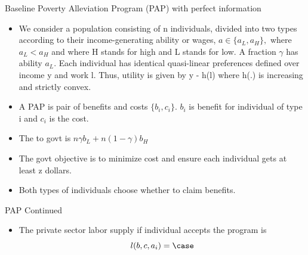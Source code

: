 \documentclass{beamer}
\begin{document}
\begin{frame}{Baseline Poverty Alleviation Program (PAP) with perfect information}
\begin{itemize}
    \item We consider a population consisting of n
 individuals, divided into two types according
 to their income-generating ability or wages, $ a \in
 \{a_L, a_H\},$ where $a_L <a_H $ and where H stands
 for high and L stands for low. A fraction $\gamma$
 has ability $a_L$. Each individual has identical quasi-linear preferences defined over income y and work l. Thus, utility is given by y - h(l) where
 h(.) is increasing and strictly convex.
 \item A PAP is pair of benefits and costs $\{b_i , c_i\}$. $b_i$ is benefit for individual of type i and $c_i$ is the cost. 
 \item The to govt is $n \gamma b_L + n(1-\gamma) b_H$
 \item The govt objective is to minimize cost and ensure each individual gets at least z dollars. 
 \item Both types of individuals choose whether to claim benefits.
\end{itemize}

\end{frame}

\begin{frame}{PAP Continued }
\begin{itemize}
    \item The private sector labor supply if individual accepts the program is 
    \[l(b,c,a_i )= \case \]
\end{itemize}
\end{frame}
\end{document}
